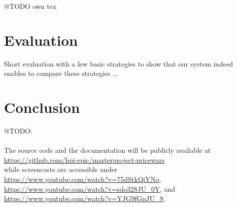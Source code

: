 @TODO own tex
\section{Evaluation}
\label{sec:evaluation}
Short evaluation with a few basic strategies to show that our system indeed enables to compare these strategies ... 

\section{Conclusion}
\label{sec:conclusion}

@TODO:\\
\\
The source code and the documentation will be publicly available at\\
\url{https://github.com/hpi-epic/masterproject-pricewars} \\
while screencasts are accessible under\\
\sloppy
\url{https://www.youtube.com/watch?v=75dStkQiYNo},  
\url{https://www.youtube.com/watch?v=sdo328JU_0Y}, and
\url{https://www.youtube.com/watch?v=YJG9fGpJU_8}.\\